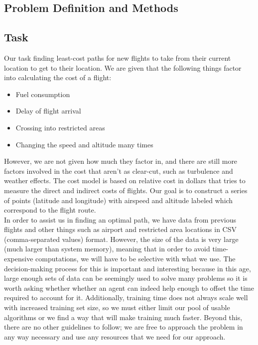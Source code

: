 \documentclass{article}[12pt]
\begin{document}
\begin{multicols}{2}
\section{Problem Definition and Methods}

\subsection{Task}
Our task finding least-cost paths for new flights to take from their current location to get to their location. We are given that the following things factor into calculating the cost of a flight:
	\begin{itemize}
		\item Fuel consumption
		\item Delay of flight arrival
		\item Crossing into restricted areas
		\item Changing the speed and altitude many times
	\end{itemize}
However, we are not given how much they factor in, and there are still more factors involved in the cost that aren't as clear-cut, such as turbulence and weather effects. The cost model is based on relative cost in dollars that tries to measure the direct and indirect costs of flights. Our goal is to construct a series of points (latitude and longitude) with airspeed and altitude labeled which correspond to the flight route.\\

In order to assist us in finding an optimal path, we have data from previous flights and other things such as airport and restricted area locations in CSV (comma-separated values) format. However, the size of the data is very large (much larger than system memory), meaning that in order to avoid time-expensive computations, we will have to be selective with what we use. The decision-making process for this is important and interesting because in this age, large enough sets of data can be seemingly used to solve many problems so it is worth asking whether whether an agent can indeed help enough to offset the time required to account for it. Additionally, training time does not always scale well with increased training set size, so we must either limit our pool of usable algorithms or we find a way that will make training much faster. Beyond this, there are no other guidelines to follow; we are free to approach the problem in any way necessary and use any resources that we need for our approach. \\


\end{multicols}
\end{document}

